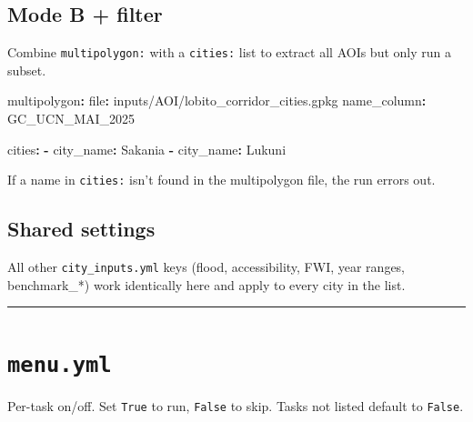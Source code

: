 \documentclass[
  letterpaper,
  DIV=11,
  numbers=noendperiod]{scrreprt}
\newenvironment{Shaded}{\begin{snugshade}}{\end{snugshade}}
\newcommand{\AttributeTok}[1]{\textcolor[rgb]{0.40,0.45,0.13}{#1}}
\newcommand{\FunctionTok}[1]{\textcolor[rgb]{0.28,0.35,0.67}{#1}}
\newcommand{\KeywordTok}[1]{\textcolor[rgb]{0.00,0.23,0.31}{\textbf{#1}}}
\begin{document}
\subsection{Mode B + filter}\label{mode-b-filter}

Combine \texttt{multipolygon:} with a \texttt{cities:} list to extract
all AOIs but only run a subset.

\begin{Shaded}
\begin{Highlighting}[]
\FunctionTok{multipolygon}\KeywordTok{:}
\AttributeTok{  }\FunctionTok{file}\KeywordTok{:}\AttributeTok{ inputs/AOI/lobito\_corridor\_cities.gpkg}
\AttributeTok{  }\FunctionTok{name\_column}\KeywordTok{:}\AttributeTok{ GC\_UCN\_MAI\_2025}

\FunctionTok{cities}\KeywordTok{:}
\AttributeTok{  }\KeywordTok{{-}}\AttributeTok{ }\FunctionTok{city\_name}\KeywordTok{:}\AttributeTok{ Sakania}
\AttributeTok{  }\KeywordTok{{-}}\AttributeTok{ }\FunctionTok{city\_name}\KeywordTok{:}\AttributeTok{ Lukuni}
\end{Highlighting}
\end{Shaded}

If a name in \texttt{cities:} isn't found in the multipolygon file, the
run errors out.

\subsection{Shared settings}\label{shared-settings}

All other \texttt{city\_inputs.yml} keys (flood, accessibility, FWI,
year ranges, benchmark\_*) work identically here and apply to every city
in the list.

\begin{center}\rule{0.5\linewidth}{0.5pt}\end{center}

\section{\texorpdfstring{\texttt{menu.yml}}{menu.yml}}\label{menu.yml}

Per-task on/off. Set \texttt{True} to run, \texttt{False} to skip. Tasks
not listed default to \texttt{False}.
\end{document}
